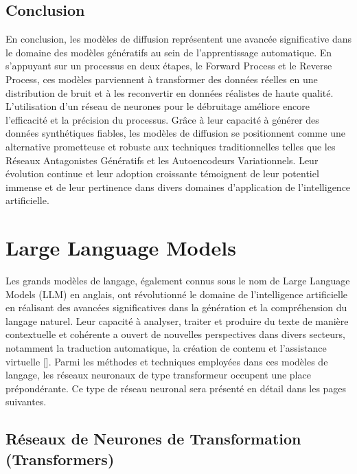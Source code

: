 \subsection{Conclusion}

En conclusion, les modèles de diffusion représentent une avancée significative
dans le domaine des modèles génératifs au sein de l'apprentissage automatique.
En s'appuyant sur un processus en deux étapes, le Forward Process et le Reverse
Process, ces modèles parviennent à transformer des données réelles en une
distribution de bruit et à les reconvertir en données réalistes de haute
qualité. L'utilisation d'un réseau de neurones pour le débruitage améliore
encore l'efficacité et la précision du processus. Grâce à leur capacité à
générer des données synthétiques fiables, les modèles de diffusion se
positionnent comme une alternative prometteuse et robuste aux techniques
traditionnelles telles que les Réseaux Antagonistes Génératifs et les
Autoencodeurs Variationnels. Leur évolution continue et leur adoption
croissante témoignent de leur potentiel immense et de leur pertinence dans
divers domaines d'application de l'intelligence artificielle.

\newpage

\section{Large Language Models}
Les grands modèles de langage, également connus sous le nom de Large Language
Models (LLM) en anglais, ont révolutionné le domaine de l'intelligence
artificielle en réalisant des avancées significatives dans la génération et la
compréhension du langage naturel. Leur capacité à analyser, traiter et produire
du texte de manière contextuelle et cohérente a ouvert de nouvelles
perspectives dans divers secteurs, notamment la traduction automatique, la
création de contenu et l'assistance virtuelle [\cite{naveed2023overview}].
Parmi les méthodes et techniques employées dans ces modèles de langage, les
réseaux neuronaux de type transformeur occupent une place prépondérante. Ce
type de réseau neuronal sera présenté en détail dans les pages suivantes.

\subsection{Réseaux de Neurones de Transformation (Transformers)}

